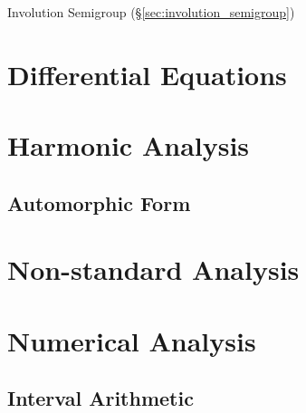 Involution Semigroup (\S\ref{sec:involution_semigroup})



\section{Differential Equations}\label{sec:differential_equations}

\section{Harmonic Analysis}\label{sec:harmonic_analysis}

\subsection{Automorphic Form}\label{sec:automorphic_form}



\section{Non-standard Analysis}\label{sec:nonstandard_analysis}

\section{Numerical Analysis}\label{sec:numerical_analysis}

\subsection{Interval Arithmetic}\label{sec:interval_arithmetic}



